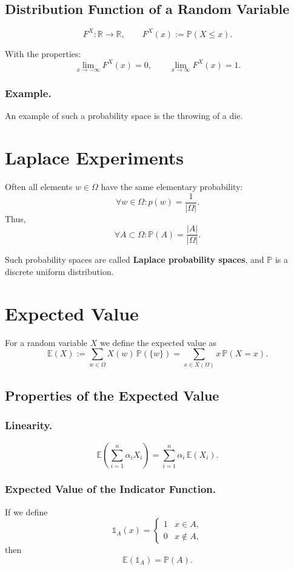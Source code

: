 \documentclass{article}
\begin{document}
\subsection{Distribution Function of a Random Variable}

\[
F^X : \mathbb{R} \to \mathbb{R},\qquad
F^X(x) := \mathbb{P}(X \le x).
\]

With the properties:
\[
\lim_{x\to -\infty} F^X(x) = 0,
\qquad
\lim_{x\to \infty} F^X(x) = 1.
\]

\subsubsection{Example.}
An example of such a probability space is the throwing of a die.

\section{Laplace Experiments}

Often all elements $w \in \Omega$ have the same elementary probability:
\[
\forall w \in \Omega : p(w) = \frac{1}{|\Omega|}.
\]
Thus,
\[
\forall A \subset \Omega : \mathbb{P}(A) = \frac{|A|}{|\Omega|}.
\]

Such probability spaces are called \textbf{Laplace probability spaces}, and 
$\mathbb{P}$ is a discrete uniform distribution.

\section{Expected Value}

For a random variable $X$ we define the expected value as
\[
\mathbb{E}(X) := \sum_{w\in \Omega} X(w)\,\mathbb{P}(\{w\})
= \sum_{x\in X(\Omega)} x\,\mathbb{P}(X = x).
\]

\subsection{Properties of the Expected Value}

\subsubsection{Linearity.}
\[
\mathbb{E}\!\left(\sum_{i=1}^n \alpha_i X_i\right)
= \sum_{i=1}^n \alpha_i\, \mathbb{E}(X_i).
\]

\subsubsection{Expected Value of the Indicator Function.}
If we define
\[
\mathds{1}_A(x) =
\begin{cases}
1 & x \in A,\\
0 & x \notin A,
\end{cases}
\]
then
\[
\mathbb{E}(\mathds{1}_A) = \mathbb{P}(A).
\]
\end{document}
